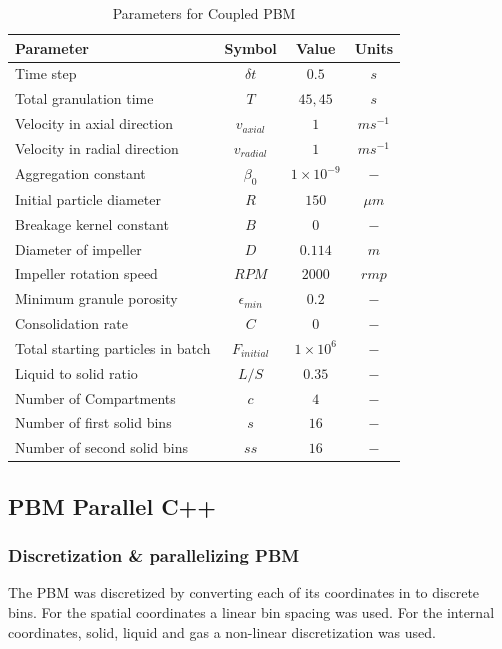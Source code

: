 \documentclass[preprint,11pt,authoryear]{elsarticle}
\begin{document}
\begin{table}[H]
\caption{Parameters for Coupled PBM}
\label{table:mthds_pbm_parameters}
\begin{center}
\begin{tabular}{l|c|c|c}
\hline
\bf{Parameter} &\bf{Symbol} &\bf{Value} &\bf{Units}\\
\hline
Time step & $\delta t$ & $0.5$ & $s$\\
Total granulation time & $T$ & $45, 45$ & $s$\\
Velocity in axial direction & $v_{axial}$ & $1$ & $ms^{-1}$\\
Velocity in radial direction & $v_{radial}$ & $1$ & $ms^{-1}$\\
Aggregation constant & $\beta_0$ & $1\times10^{-9}$ & $-$\\
Initial particle diameter & $R$ & $150$ & $\mu m$\\
Breakage kernel constant & $B$ & $0$ & $-$\\
Diameter of impeller & $D$ & $0.114$ & $m$ \\
Impeller rotation speed & $RPM$ & $2000$ & $rmp$\\
Minimum granule porosity & $\epsilon_{min}$ & $0.2$ & $-$\\
Consolidation rate & $C$ & $0$ & $-$\\
Total starting particles in batch & $F_{initial}$ & $1 \times 10^{6}$ & $-$\\
Liquid to solid ratio & $L/S$ & $0.35$ & $-$ \\
Number of Compartments & $c$ & $4$ & $-$ \\
Number of first solid bins & $s$ & $16$ & $-$\\
Number of second solid bins & $ss$ & $16$ & $-$\\
\hline
\end{tabular}
\end{center}
\end{table}


\subsection{PBM Parallel C++}
\subsubsection{Discretization \& parallelizing PBM}
The PBM was discretized by converting each of its coordinates in to discrete bins. For the spatial 
coordinates a linear bin spacing was used. For the internal coordinates, solid, liquid and gas a 
non-linear discretization was used.
\end{document}
